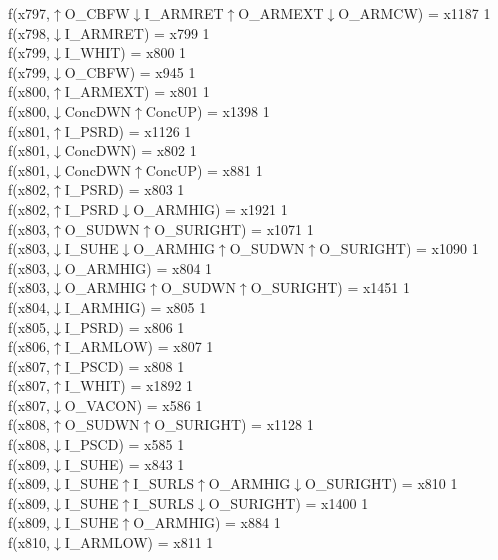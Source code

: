 f(x797,$\uparrow$O\_CBFW$\downarrow$I\_ARMRET$\uparrow$O\_ARMEXT$\downarrow$O\_ARMCW) = x1187 {1} \\
f(x798,$\downarrow$I\_ARMRET) = x799 {1} \\
f(x799,$\downarrow$I\_WHIT) = x800 {1} \\
f(x799,$\downarrow$O\_CBFW) = x945 {1} \\
f(x800,$\uparrow$I\_ARMEXT) = x801 {1} \\
f(x800,$\downarrow$ConcDWN$\uparrow$ConcUP) = x1398 {1} \\
f(x801,$\uparrow$I\_PSRD) = x1126 {1} \\
f(x801,$\downarrow$ConcDWN) = x802 {1} \\
f(x801,$\downarrow$ConcDWN$\uparrow$ConcUP) = x881 {1} \\
f(x802,$\uparrow$I\_PSRD) = x803 {1} \\
f(x802,$\uparrow$I\_PSRD$\downarrow$O\_ARMHIG) = x1921 {1} \\
f(x803,$\uparrow$O\_SUDWN$\uparrow$O\_SURIGHT) = x1071 {1} \\
f(x803,$\downarrow$I\_SUHE$\downarrow$O\_ARMHIG$\uparrow$O\_SUDWN$\uparrow$O\_SURIGHT) = x1090 {1} \\
f(x803,$\downarrow$O\_ARMHIG) = x804 {1} \\
f(x803,$\downarrow$O\_ARMHIG$\uparrow$O\_SUDWN$\uparrow$O\_SURIGHT) = x1451 {1} \\
f(x804,$\downarrow$I\_ARMHIG) = x805 {1} \\
f(x805,$\downarrow$I\_PSRD) = x806 {1} \\
f(x806,$\uparrow$I\_ARMLOW) = x807 {1} \\
f(x807,$\uparrow$I\_PSCD) = x808 {1} \\
f(x807,$\uparrow$I\_WHIT) = x1892 {1} \\
f(x807,$\downarrow$O\_VACON) = x586 {1} \\
f(x808,$\uparrow$O\_SUDWN$\uparrow$O\_SURIGHT) = x1128 {1} \\
f(x808,$\downarrow$I\_PSCD) = x585 {1} \\
f(x809,$\downarrow$I\_SUHE) = x843 {1} \\
f(x809,$\downarrow$I\_SUHE$\uparrow$I\_SURLS$\uparrow$O\_ARMHIG$\downarrow$O\_SURIGHT) = x810 {1} \\
f(x809,$\downarrow$I\_SUHE$\uparrow$I\_SURLS$\downarrow$O\_SURIGHT) = x1400 {1} \\
f(x809,$\downarrow$I\_SUHE$\uparrow$O\_ARMHIG) = x884 {1} \\
f(x810,$\downarrow$I\_ARMLOW) = x811 {1} \\
